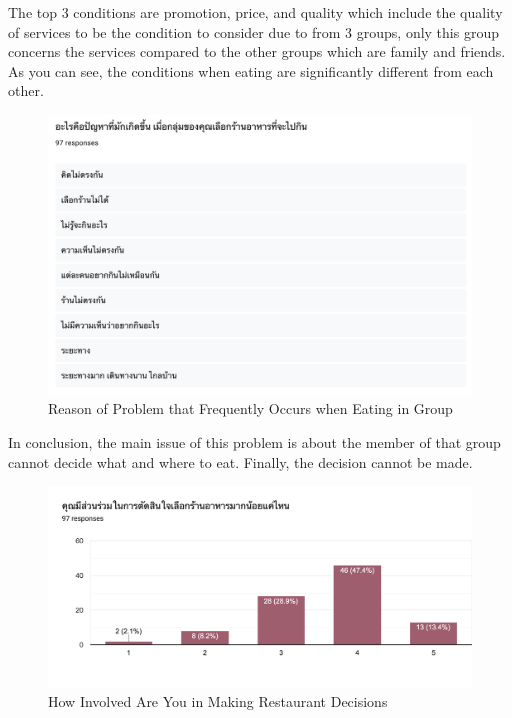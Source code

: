 \documentclass[12pt,oneside,openright,a4paper]{cpe-english-project}
\begin{document}
The top 3 conditions are promotion, price, and quality which include the quality of services to be the condition to consider due to from 3 groups, only this group concerns the services compared to the other groups which are family and friends. As you can see, the conditions when eating are significantly different from each other.

\begin{figure}[H]\centering
\includegraphics[width=350pt]{./images/A1ReasonofProblemthatFrequentlyOccurswhenEatinginGroup.png}
\caption{Reason of Problem that Frequently Occurs when Eating in Group}\label{fig:A1ReasonofProblemthatFrequentlyOccurswhenEatinginGroup}
\end{figure}\vspace{-24pt}

In conclusion, the main issue of this problem is about the member of that group cannot decide what and where to eat. Finally, the decision cannot be made.

\begin{figure}[H]\centering
\includegraphics[width=350pt]{./images/A1HowInvolvedAreYouinMakingRestaurantDecisions.png}
\caption{How Involved Are You in Making Restaurant Decisions}\label{fig:A1HowInvolvedAreYouinMakingRestaurantDecisions}
\end{figure}\vspace{-24pt}
\end{document}
